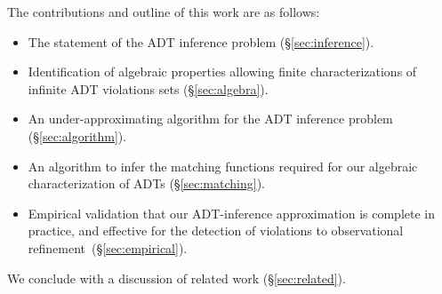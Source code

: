 The contributions and outline of this work are as follows:
\begin{itemize}

  \item The statement of the ADT inference problem (§\ref{sec:inference}).

  \item Identification of algebraic properties allowing finite
  characterizations of infinite ADT violations sets (§\ref{sec:algebra}).

  \item An under-approximating algorithm for the ADT inference problem
  (§\ref{sec:algorithm}).

  \item An algorithm to infer the matching functions required for our algebraic
  characterization of ADTs (§\ref{sec:matching}).

  \item Empirical validation that our ADT-inference approximation is complete
  in practice, and effective for the detection of violations to observational
  refinement~(§\ref{sec:empirical}).

\end{itemize}
We conclude with a discussion of related work (§\ref{sec:related}).
